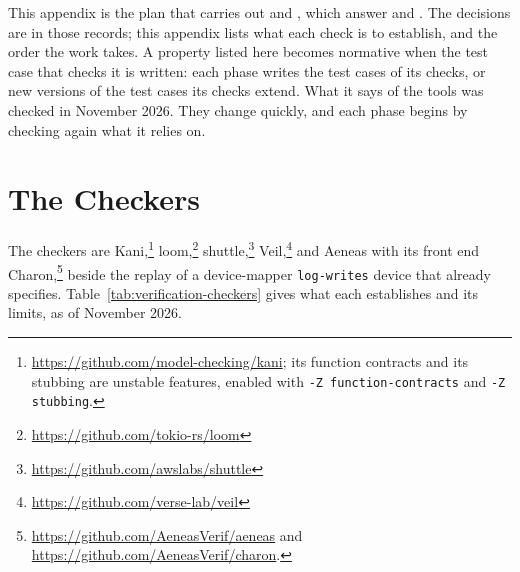 %

This appendix is the plan that carries out
 and ,
which answer  and
. The decisions are in those records;
this appendix lists what each check is to establish, and the order the work
takes. A property listed here becomes normative when the test case that
checks it is written: each phase writes the test cases of its checks, or new
versions of the test cases its checks extend. What it says of the tools was
checked in November 2026. They change quickly, and each phase begins by
checking again what it relies on.

\section{The Checkers}
\label{app:verification-checkers}

The checkers are Kani,\footnote{\url{https://github.com/model-checking/kani};
its function contracts and its stubbing are unstable features, enabled with
\texttt{-Z function-contracts} and \texttt{-Z stubbing}.}
loom,\footnote{\url{https://github.com/tokio-rs/loom}}
shuttle,\footnote{\url{https://github.com/awslabs/shuttle}}
Veil,\footnote{\url{https://github.com/verse-lab/veil}} and Aeneas with its
front end Charon,\footnote{\url{https://github.com/AeneasVerif/aeneas} and
\url{https://github.com/AeneasVerif/charon}.} beside the replay of a
device-mapper \texttt{log-writes} device that
 already specifies.
Table~\ref{tab:verification-checkers} gives what each establishes and its
limits, as of November 2026.

